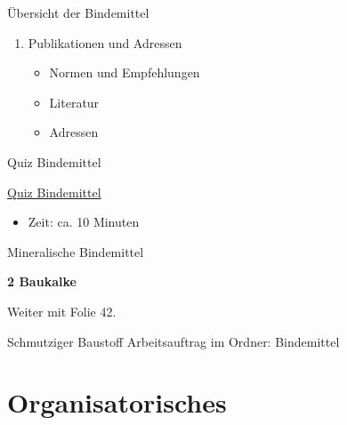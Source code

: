 \begin{frame}{Übersicht der Bindemittel}
\begin{multicols}{2}
\begin{enumerate}[label=\textbf{\arabic*}, leftmargin=0.25em, itemsep=0.5em]
            \item Publikationen und Adressen
                  \begin{itemize}[leftmargin=0.5em, itemsep=0.1em]
                      \small
                      \item Normen und Empfehlungen
                      \item Literatur
                      \item Adressen
                  \end{itemize}
        \end{enumerate}
    \end{multicols}
\end{frame}

\begin{frame}{Quiz Bindemittel}

    \centering
    \LARGE \href{https://forms.office.com/Pages/ResponsePage.aspx?id=HsbbSHAOrE6HJuK4duaJwdUERlKbBqZKkaxTc87ge2NUNkRERDIzRkZDMjEyRUtBRlZQVkZDVzdUQi4u}{Quiz Bindemittel}
    \normalsize
    \vspace{\baselineskip}
    \begin{itemize}
        \item Zeit: ca. 10 Minuten
    \end{itemize}

\end{frame}


\begin{frame}{Mineralische Bindemittel}
    \begin{tcolorbox}[colback=gray!20, colframe=white, boxrule=0pt, width=\paperwidth, sharp corners]
        \textbf{\color{blau_bauschule} \large 2 Baukalke}
    \end{tcolorbox}
    \vspace{\baselineskip}
    Weiter mit Folie 42.

    \vspace{\fill}

\end{frame}


\begin{frame}{Schmutziger Baustoff}
    Arbeitsauftrag im Ordner: Bindemittel

\end{frame}



\section{Organisatorisches}
\BlueSectionSlide

